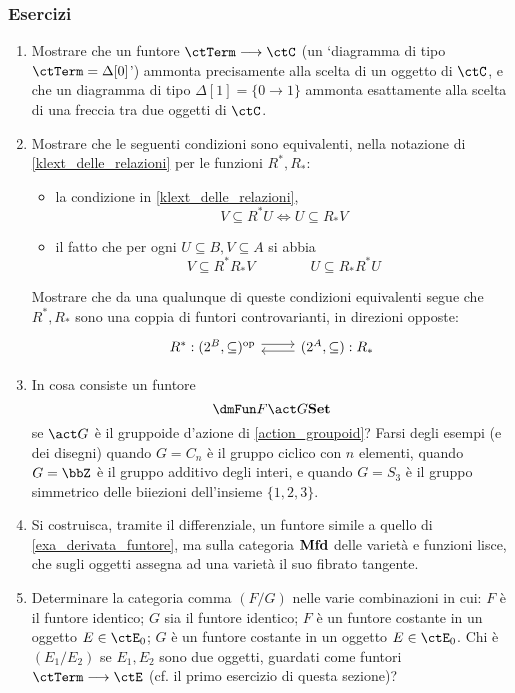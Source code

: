 \subsubsection*{Esercizi}
\begin{enumerate}
	\item Mostrare che un funtore $\ctTerm \fun\ctC$ (un `diagramma di tipo $\ctTerm = \Delta[0]$') ammonta precisamente alla scelta di un oggetto di $\ctC$, e che un diagramma di tipo $\Delta[1] = \{0\to 1\}$ ammonta esattamente alla scelta di una freccia tra due oggetti di $\ctC$.
	\item Mostrare che le seguenti condizioni sono equivalenti, nella notazione di \ref{klext_delle_relazioni} per le funzioni \(R^*,R_*\):
	      \begin{itemize}
		      \item la condizione in \ref{klext_delle_relazioni},
		            \[V\subseteq R^*U\iff U\subseteq R_*V\]
		      \item il fatto che per ogni \(U\subseteq B,V\subseteq A\) si abbia
		            \[V\subseteq R^*R_*V\qquad\qquad U\subseteq R_*R^*U\]
	      \end{itemize}
	      Mostrare che da una qualunque di queste condizioni equivalenti segue che \(R^*,R_*\) sono una coppia di funtori controvarianti, in direzioni opposte:
	      \[\begin{tikzcd}
			      R^* : (2^B,\subseteq)^\op \ar[r, shift left] & (2^A,\subseteq) : R_* \ar[l, shift left]
		      \end{tikzcd}\]
	\item In cosa consiste un funtore 
	\[\dmFun F {\act G}\ctSet\]
	se $\act G$ è il gruppoide d'azione di \ref{action_groupoid}? Farsi degli esempi (e dei disegni) quando $G=C_n$ è il gruppo ciclico con $n$ elementi, quando $G=\bbZ$ è il gruppo additivo degli interi, e quando $G=S_3$ è il gruppo simmetrico delle biiezioni dell'insieme $\{1,2,3\}$.
	\item Si costruisca, tramite il differenziale, un funtore simile a quello di \ref{exa_derivata_funtore}, ma sulla categoria \(\mathbf{Mfd}\) delle varietà e funzioni lisce, che sugli oggetti assegna ad una varietà il suo fibrato tangente.
	\item Determinare la categoria comma $(F/G)$ nelle varie combinazioni in cui: $F$ è il funtore identico; $G$ sia il funtore identico; $F$ è un funtore costante in un oggetto $E\in\ctE_0$; $G$ è un funtore costante in un oggetto $E\in\ctE_0$. Chi è $(E_1/E_2)$ se $E_1,E_2$ sono due oggetti, guardati come funtori $\ctTerm \fun\ctE$ (cf. il primo esercizio di questa sezione)?
\end{enumerate}

